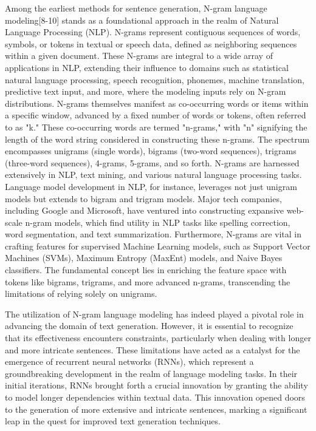 \documentclass[conference]{IEEEtran}
\begin{document}
Among the earliest methods for sentence generation, N-gram language modeling[8-10] stands as a foundational approach in the realm of Natural Language Processing (NLP). N-grams represent contiguous sequences of words, symbols, or tokens in textual or speech data, defined as neighboring sequences within a given document. These N-grams are integral to a wide array of applications in NLP, extending their influence to domains such as statistical natural language processing, speech recognition, phonemes, machine translation, predictive text input, and more, where the modeling inputs rely on N-gram distributions. N-grams themselves manifest as co-occurring words or items within a specific window, advanced by a fixed number of words or tokens, often referred to as "k." These co-occurring words are termed "n-grams," with "n" signifying the length of the word string considered in constructing these n-grams. The spectrum encompasses unigrams (single words), bigrams (two-word sequences), trigrams (three-word sequences), 4-grams, 5-grams, and so forth. N-grams are harnessed extensively in NLP, text mining, and various natural language processing tasks. Language model development in NLP, for instance, leverages not just unigram models but extends to bigram and trigram models. Major tech companies, including Google and Microsoft, have ventured into constructing expansive web-scale n-gram models, which find utility in NLP tasks like spelling correction, word segmentation, and text summarization. Furthermore, N-grams are vital in crafting features for supervised Machine Learning models, such as Support Vector Machines (SVMs), Maximum Entropy (MaxEnt) models, and Naive Bayes classifiers. The fundamental concept lies in enriching the feature space with tokens like bigrams, trigrams, and more advanced n-grams, transcending the limitations of relying solely on unigrams.




The utilization of N-gram language modeling has indeed played a pivotal role in advancing the domain of text generation. However, it is essential to recognize that its effectiveness encounters constraints, particularly when dealing with longer and more intricate sentences. These limitations have acted as a catalyst for the emergence of recurrent neural networks (RNNs), which represent a groundbreaking development in the realm of language modeling tasks. In their initial iterations, RNNs brought forth a crucial innovation by granting the ability to model longer dependencies within textual data. This innovation opened doors to the generation of more extensive and intricate sentences, marking a significant leap in the quest for improved text generation techniques.
\end{document}
